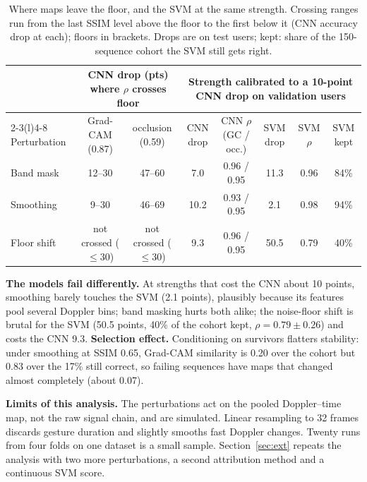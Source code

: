 \documentclass[11pt]{article}
\begin{document}
\begin{table}[!tb]
\centering
\footnotesize
\setlength{\tabcolsep}{2.5pt}
\begin{tabular}{@{}lccccccc@{}}
\toprule
 & \multicolumn{2}{c}{CNN drop (pts) where $\rho$ crosses floor} & \multicolumn{5}{c}{Strength calibrated to a 10-point CNN drop on validation users} \\
\cmidrule(lr){2-3}\cmidrule(l){4-8}
Perturbation & Grad-CAM (0.87) & occlusion (0.59) & CNN drop & CNN $\rho$ (GC / occ.) & SVM drop & SVM $\rho$ & SVM kept \\
\midrule
Band mask & 12--30 & 47--60 & 7.0 & 0.96 / 0.95 & 11.3 & 0.96 & 84\% \\
Smoothing & 9--30 & 46--69 & 10.2 & 0.93 / 0.95 & 2.1 & 0.98 & 94\% \\
Floor shift & not crossed ($\le$30) & not crossed ($\le$30) & 9.3 & 0.96 / 0.95 & 50.5 & 0.79 & 40\% \\
\bottomrule
\end{tabular}
\caption{Where maps leave the floor, and the SVM at the same strength. Crossing ranges run from the last SSIM level above the floor to the first below it (CNN accuracy drop at each); floors in brackets. Drops are on test users; kept: share of the 150-sequence cohort the SVM still gets right.}
\label{tab:cross}
\end{table}

\textbf{The models fail differently.} At strengths that cost the CNN about 10 points, smoothing barely touches the SVM (2.1 points), plausibly because its features pool several Doppler bins; band masking hurts both alike; the noise-floor shift is brutal for the SVM (50.5 points, 40\% of the cohort kept, $\rho=0.79\pm0.26$) and costs the CNN 9.3. \textbf{Selection effect.} Conditioning on survivors flatters stability: under smoothing at SSIM 0.65, Grad-CAM similarity is 0.20 over the cohort but 0.83 over the 17\% still correct, so failing sequences have maps that changed almost completely (about 0.07).

\textbf{Limits of this analysis.} The perturbations act on the pooled Doppler--time map, not the raw signal chain, and are simulated. Linear resampling to 32 frames discards gesture duration and slightly smooths fast Doppler changes. Twenty runs from four folds on one dataset is a small sample. Section~\ref{sec:ext} repeats the analysis with two more perturbations, a second attribution method and a continuous SVM score.
\end{document}
